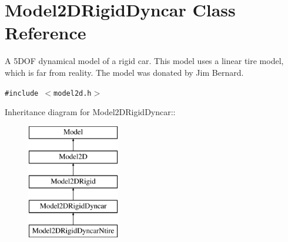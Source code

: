 \section{Model2DRigid\-Dyncar  Class Reference}
\label{class_Model2DRigidDyncar}
A 5DOF dynamical model of a rigid car. This model uses a linear tire model, which is far from reality. The model was donated by Jim Bernard. 


{\tt \#include $<$model2d.h$>$}

Inheritance diagram for Model2DRigid\-Dyncar::\begin{figure}[H]
\begin{center}
\leavevmode
\includegraphics[height=5cm]{class_Model2DRigidDyncar}
\end{center}
\end{figure}
